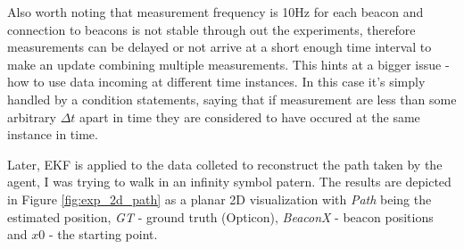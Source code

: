 Also worth noting that measurement frequency is 10Hz for each beacon and connection to beacons is not stable through out the experiments, therefore measurements can be delayed or not arrive at a short enough time interval to make an update combining multiple measurements. This hints at a bigger issue - how to use data incoming at different time instances. In this case it's simply handled by a condition statements, saying that if measurement are less than some arbitrary $\Delta t$ apart in time they are considered to have occured at the same instance in time. 

Later, EKF is applied to the data colleted to reconstruct the path taken by the agent, I was trying to walk in an infinity symbol patern. The results are depicted in Figure \ref{fig:exp_2d_path} as a planar 2D visualization with \emph{Path} being the estimated position, \emph{GT} - ground truth (Opticon), \emph{BeaconX} - beacon positions and \emph{$x0$} - the starting point.


